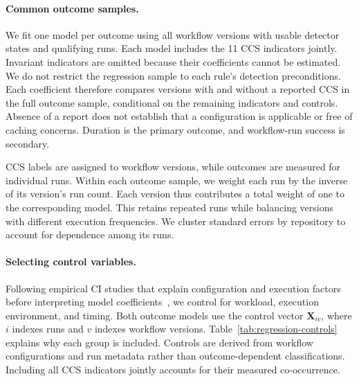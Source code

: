 \documentclass[smallextended]{svjour3}
\begin{document}
\paragraph{Common outcome samples.} We fit one model per outcome using all workflow versions with usable detector states and qualifying runs. Each model includes the 11 CCS indicators jointly. Invariant indicators are omitted because their coefficients cannot be estimated. We do not restrict the regression sample to each rule's detection preconditions. Each coefficient therefore compares versions with and without a reported CCS in the full outcome sample, conditional on the remaining indicators and controls. Absence of a report does not establish that a configuration is applicable or free of caching concerns. Duration is the primary outcome, and workflow-run success is secondary.

CCS labels are assigned to workflow versions, while outcomes are measured for individual runs. Within each outcome sample, we weight each run by the inverse of its version's run count. Each version thus contributes a total weight of one to the corresponding model. This retains repeated runs while balancing versions with different execution frequencies. We cluster standard errors by repository to account for dependence among its runs.

\paragraph{Selecting control variables.}
Following empirical CI studies that explain configuration and execution factors before interpreting model coefficients~\citep{ghaleb2019empirical,ghaleb2022studying}, we control for workload, execution environment, and timing. Both outcome models use the control vector $\mathbf{X}_{iv}$, where $i$ indexes runs and $v$ indexes workflow versions. Table~\ref{tab:regression-controls} explains why each group is included. Controls are derived from workflow configurations and run metadata rather than outcome-dependent classifications. Including all CCS indicators jointly accounts for their measured co-occurrence.
\end{document}
